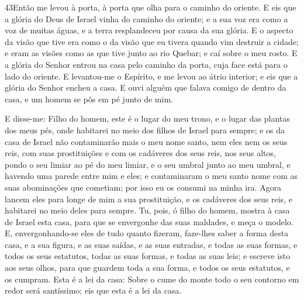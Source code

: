 \medskip

\lettrine{43} Então me levou à porta, à porta que olha para o
caminho do oriente. E eis que a glória do Deus de Israel vinha
do caminho do oriente; e a sua voz era como a voz de muitas águas, e
a terra resplandeceu por causa da sua glória. E o aspecto da
visão que tive era como o da visão que eu tivera quando vim destruir
a cidade; e eram as visões como as que tive junto ao rio Quebar; e
caí sobre o meu rosto. E a glória do Senhor entrou na casa pelo
caminho da porta, cuja face está para o lado do oriente. E
levantou-me o Espírito, e me levou ao átrio interior; e eis que a
glória do Senhor encheu a casa. E ouvi alguém que falava comigo
de dentro da casa, e um homem se pôs em pé junto de mim.

E disse-me: Filho do homem, este é o lugar do meu trono, e o lugar
das plantas dos meus pés, onde habitarei no meio dos filhos de
Israel para sempre; e os da casa de Israel não contaminarão mais o
meu nome santo, nem eles nem os seus reis, com suas prostituições e
com os cadáveres dos seus reis, nos seus altos, pondo o seu
limiar ao pé do meu limiar, e o seu umbral junto ao meu umbral, e
havendo uma parede entre mim e eles; e contaminaram o meu santo nome
com as suas abominações que cometiam; por isso eu os consumi na
minha ira. Agora lancem eles para longe de mim a sua
prostituição, e os cadáveres dos seus reis, e habitarei no meio
deles para sempre. Tu, pois, ó filho do homem, mostra à casa
de Israel esta casa, para que se envergonhe das suas maldades, e
meça o modelo. E, envergonhando-se eles de tudo quanto
fizeram, faze-lhes saber a forma desta casa, e a sua figura, e as
suas saídas, e as suas entradas, e todas as suas formas, e todos os
seus estatutos, todas as suas formas, e todas as suas leis; e
escreve isto aos seus olhos, para que guardem toda a sua forma, e
todos os seus estatutos, e os cumpram. Esta é a lei da casa:
Sobre o cume do monte todo o seu contorno em redor será santíssimo;
eis que esta é a lei da casa.

